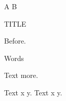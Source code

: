 \documentclass{article}
\newcommand\after{[after]}
\begin{document}
\begin{center}
    A B \\ \medskip

    \begingroup
        \color{red}TITLE
    \endgroup
\end{center}
Before.\par
\begingroup\color{blue}\leavevmode Words \endgroup\par
\begingroup\aftergroup\after\leavevmode Text\endgroup{} more.\par
Text {\color{green}x} y.
\clearpage
Text {\color{blue}x} y.
\end{document}
